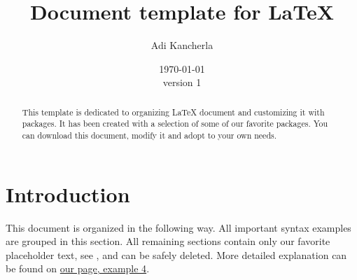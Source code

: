 \documentclass[a4paper]{article}
\begin{document}
\pagecolor{oldlace}

\title{Document template for \LaTeX}
\author{Adi Kancherla}
\date{\today \\version 1}

\maketitle

\begin{abstract}
This template is dedicated to organizing \LaTeX{} document and customizing it
with packages. It has been created with a selection of some of our favorite
packages. You can download this document, modify it and adopt to your own
needs. 
\end{abstract}


\section{Introduction}\label{Sect:Introduction}
This document is organized in the following way. All important syntax examples
are grouped in this section. All remaining sections contain only our favorite
placeholder text, see \cite{LoremIpsum_wiki}, and can be safely deleted. More
detailed explanation can be found on
\href{http://www.electronics.oulu.fi/latex/examples/example_4/index.html}{our
page, example 4}.
\end{document}
